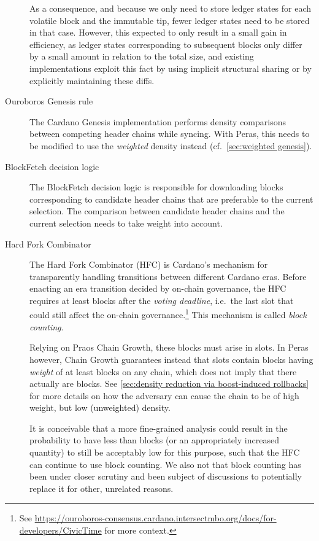 \begin{description}
  As a consequence, and because we only need to store ledger states for each volatile block and the immutable tip, fewer ledger states need to be stored in that case.
  However, this expected to only result in a small gain in efficiency, as ledger states corresponding to subsequent blocks only differ by a small amount in relation to the total size, and existing implementations exploit this fact by using implicit structural sharing or by explicitly maintaining these diffs.
\item[Ouroboros Genesis rule]
  The Cardano Genesis implementation \parencite{genesis-implementation-documentation} performs density comparisons between competing header chains while syncing.
  With Peras, this needs to be modified to use the \emph{weighted} density instead (cf.~\cref{sec:weighted genesis}).
\item[BlockFetch decision logic]
  The BlockFetch decision logic is responsible for downloading blocks corresponding to candidate header chains that are preferable to the current selection.
  The comparison between candidate header chains and the current selection needs to take weight into account.
\item[Hard Fork Combinator]
  The Hard Fork Combinator (HFC) is Cardano's mechanism for transparently handling transitions between different Cardano eras.
  Before enacting an era transition decided by on-chain governance, the HFC requires at least \kcp{} blocks after the \emph{voting deadline}, i.e.\ the last slot that could still affect the on-chain governance.\footnote{
    See \url{https://ouroboros-consensus.cardano.intersectmbo.org/docs/for-developers/CivicTime} for more context.}
  This mechanism is called \emph{block counting}.

  Relying on Praos Chain Growth, these \kcp{} blocks must arise in \Tcp{} slots.
  In Peras however, Chain Growth guarantees instead that \Tcp{} slots contain blocks having \emph{weight} of at least \kcp{} blocks on any chain, which does not imply that there actually are \kcp{} blocks.
  See \cref{sec:density reduction via boost-induced rollbacks} for more details on how the adversary can cause the chain to be of high weight, but low (unweighted) density.

  It is conceivable that a more fine-grained analysis could result in the probability to have less than \kcp{} blocks (or an appropriately increased quantity) to still be acceptably low for this purpose, such that the HFC can continue to use block counting.
  We also not that block counting has been under closer scrutiny and been subject of discussions to potentially replace it for other, unrelated reasons.
\end{description}


